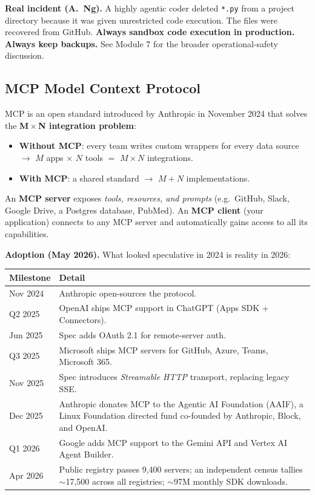 \documentclass[a4paper,11pt]{article}
\begin{document}
\begin{warning}
\textbf{Real incident (A.\ Ng).}
A highly agentic coder deleted \texttt{*.py} from a project directory
because it was given unrestricted code execution. The files were
recovered from GitHub.
\textbf{Always sandbox code execution in production. Always keep
backups.} See Module 7 for the broader operational-safety discussion.
\end{warning}

\subsection{MCP \textemdash{} Model Context Protocol}

MCP is an open standard introduced by Anthropic in November 2024 that
solves the \textbf{M\,$\times$\,N integration problem}:

\begin{itemize}[noitemsep, leftmargin=1.2em]
  \item \textbf{Without MCP}: every team writes custom wrappers for
        every data source $\to$ $M$ apps $\times$ $N$ tools $=$
        $M\times N$ integrations.
  \item \textbf{With MCP}: a shared standard $\to$ $M+N$
        implementations.
\end{itemize}

An \textbf{MCP server} exposes \emph{tools, resources, and prompts}
(e.g.\ GitHub, Slack, Google Drive, a Postgres database, PubMed). An
\textbf{MCP client} (your application) connects to any MCP server
and automatically gains access to all its capabilities.

\textbf{Adoption (May 2026).} What looked speculative in 2024 is
reality in 2026:

\begin{center}\small
\begin{tabular}{p{4.2cm} p{8.5cm}}
  \toprule
  \textbf{Milestone} & \textbf{Detail} \\
  \midrule
  Nov 2024  & Anthropic open-sources the protocol. \\
  Q2 2025   & OpenAI ships MCP support in ChatGPT (Apps SDK + Connectors). \\
  Jun 2025  & Spec adds OAuth 2.1 for remote-server auth. \\
  Q3 2025   & Microsoft ships MCP servers for GitHub, Azure, Teams, Microsoft 365. \\
  Nov 2025  & Spec introduces \textit{Streamable HTTP} transport, replacing legacy SSE. \\
  Dec 2025  & Anthropic donates MCP to the Agentic AI Foundation (AAIF), a Linux Foundation directed fund co-founded by Anthropic, Block, and OpenAI. \\
  Q1 2026   & Google adds MCP support to the Gemini API and Vertex AI Agent Builder. \\
  Apr 2026  & Public registry passes 9{,}400 servers; an independent census tallies $\sim$17{,}500 across all registries; $\sim$97M monthly SDK downloads. \\
  \bottomrule
\end{tabular}
\end{center}
\end{document}
